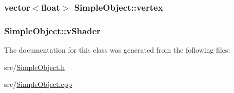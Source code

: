 \hypertarget{class_simple_object_a6c506a2b642e61f7209ee9d3e455eb6a}{
\subsubsection[{vertex}]{\setlength{\rightskip}{0pt plus 5cm}vector$<$float$>$ Simple\-Object\-::vertex}}\label{class_simple_object_a6c506a2b642e61f7209ee9d3e455eb6a}
\hypertarget{class_simple_object_aeb8f9ac2ea5c7342f14eb8d7e6afa9bc}{
\subsubsection[{v\-Shader}]{ Simple\-Object\-::v\-Shader}}\label{class_simple_object_aeb8f9ac2ea5c7342f14eb8d7e6afa9bc}


The documentation for this class was generated from the following files\-:\begin{DoxyCompactItemize}
\item 
src/\hyperlink{_simple_object_8h}{Simple\-Object.\-h}\item 
src/\hyperlink{_simple_object_8cpp}{Simple\-Object.\-cpp}\end{DoxyCompactItemize}
